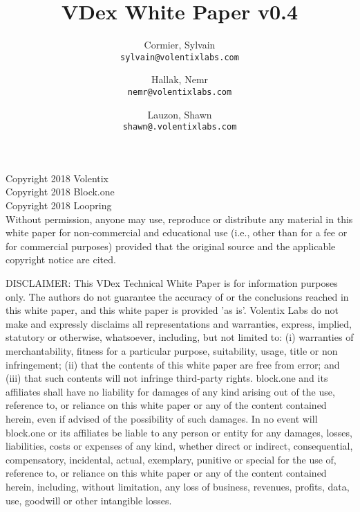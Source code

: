 \documentclass[]{article}
\title{VDex White Paper v0.4}
\author{
	Cormier, Sylvain\\
	\texttt{sylvain@volentixlabs.com}
	\and
	Hallak, Nemr\\
	\texttt{nemr@volentixlabs.com}
	\and
	Lauzon, Shawn\\
	\texttt{shawn@.volentixlabs.com}
}
\begin{document}
\tableofcontents
\maketitle

Copyright 2018 Volentix\\
Copyright 2018 Block.one\\
Copyright 2018 Loopring\\

Without permission, anyone may use, reproduce or distribute any material in this white paper for non-commercial and educational use (i.e., other than for a fee or for commercial purposes) provided that the original source and the applicable copyright notice are cited.

DISCLAIMER: This VDex Technical White Paper  is for information purposes only. The authors do not guarantee the accuracy of or the conclusions reached in this white paper, and this white paper is provided 'as is'. 
Volentix Labs do not make and expressly disclaims all representations and warranties, express, implied, statutory or otherwise, whatsoever, including, but not limited to: (i) warranties of merchantability, fitness for a particular purpose, suitability, usage, title or non infringement; (ii) that the contents of this white paper are free from error; and (iii) that such contents will not infringe third-party rights. block.one and its affiliates shall have no liability for damages of any kind arising out of the use, reference to, or reliance on this white paper or any of the content contained herein, even if advised of the possibility of such damages. In no event will block.one or its affiliates be liable to any person or entity for any damages, losses, liabilities, costs or expenses of any kind, whether direct or indirect, consequential, compensatory, incidental, actual, exemplary, punitive or special for the use of, reference to, or reliance on this white paper or any of the content contained herein, including, without limitation, any loss of business, revenues, profits, data, use, goodwill or other intangible losses.
\end{document}
